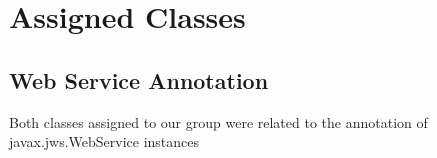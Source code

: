\section{Assigned Classes}

\subsection{Web Service Annotation}
	Both classes assigned to our group were related to the annotation of javax.jws.WebService instances
	